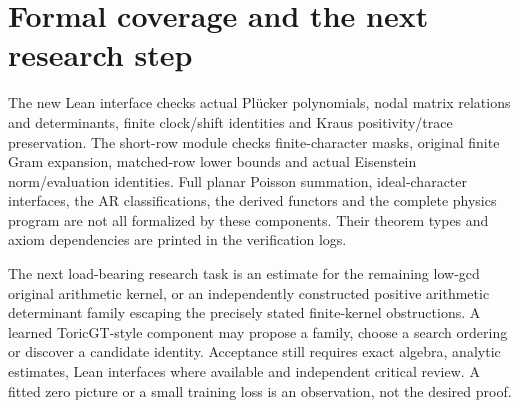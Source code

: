 


\section{Formal coverage and the next research step}
The new Lean interface checks actual Pl\"ucker polynomials, nodal matrix relations and determinants, finite clock/shift identities and Kraus positivity/trace preservation. The short-row module checks finite-character masks, original finite Gram expansion, matched-row lower bounds and actual Eisenstein norm/evaluation identities. Full planar Poisson summation, ideal-character interfaces, the AR classifications, the derived functors and the complete physics program are not all formalized by these components. Their theorem types and axiom dependencies are printed in the verification logs.

The next load-bearing research task is an estimate for the remaining low-gcd original arithmetic kernel, or an independently constructed positive arithmetic determinant family escaping the precisely stated finite-kernel obstructions. A learned ToricGT-style component may propose a family, choose a search ordering or discover a candidate identity. Acceptance still requires exact algebra, analytic estimates, Lean interfaces where available and independent critical review. A fitted zero picture or a small training loss is an observation, not the desired proof.



